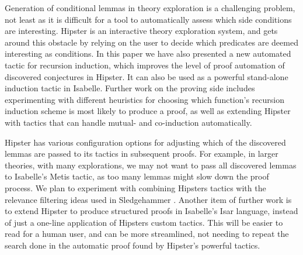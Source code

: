 \label{sec:conclusion}

Generation of conditional lemmas in theory exploration is a challenging problem, not least as it is difficult for a tool to automatically assess which side conditions are interesting.
%
Hipster is an interactive theory exploration system, and gets around this obstacle by relying on the user to decide which predicates are deemed interesting as conditions.
%
In this paper we have also presented a new automated tactic for recursion induction, which improves the level of proof automation of discovered conjectures in Hipster.
%
It can also be used as a powerful stand-alone induction tactic in Isabelle. 
%
Further work on the proving side includes experimenting with different heuristics for choosing which function's recursion induction scheme is most likely to produce a proof, as well as extending Hipster with tactics that can handle mutual- and co-induction automatically.

Hipster has various configuration options for adjusting which of the discovered lemmas are passed to its tactics in subsequent proofs.
%
For example, in larger theories, with many explorations, we may not want to pass all discovered lemmas to Isabelle's Metis tactic, as too many lemmas might slow down the proof process.
%
We plan to experiment with combining Hipsters tactics with the relevance filtering ideas used in Sledgehammer \cite{mash}.
%
Another item of further work is to extend Hipster to produce structured proofs in Isabelle's Isar language, instead of just a one-line application of Hipsters custom tactics.
%
This will be easier to read for a human user, and can be more streamlined, not needing to repeat the search done in the automatic proof found by Hipster's powerful tactics. 

